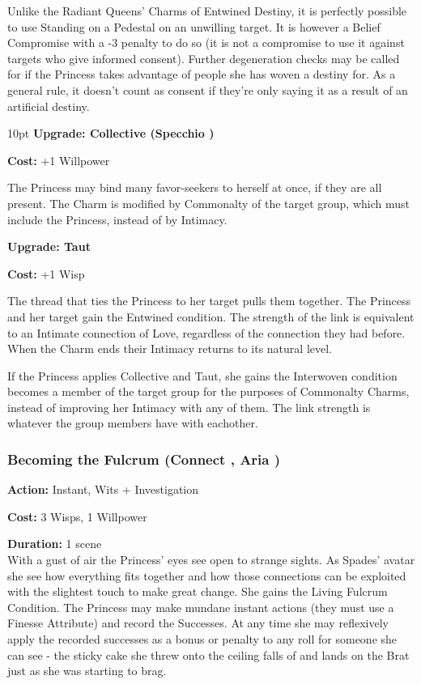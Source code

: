 Unlike the Radiant Queens' Charms of Entwined Destiny, it is perfectly possible to use Standing on a Pedestal on an unwilling target. It is however a Belief Compromise with a -3 penalty to do so (it is not a compromise to use it against targets who give informed consent). Further degeneration checks may be called for if the Princess takes advantage of people she has woven a destiny for. As a general rule, it doesn't count as consent if they're only saying it as a result of an artificial destiny.

\begin{myindentpar}{10pt} \textbf{Upgrade: Collective (Specchio \textbullet\textbullet\textbullet\textbullet)}

\noindent \textbf{Cost:} +1 Willpower

The Princess may bind many favor-seekers to herself at once, if they are all present. The Charm is modified by Commonalty of the target group, which must include the Princess, instead of by Intimacy.

\textbf{Upgrade: Taut}

\noindent \textbf{Cost:} +1 Wisp

The thread that ties the Princess to her target pulls them together. The Princess and her target gain the Entwined condition. The strength of the link is equivalent to an Intimate connection of Love, regardless of the connection they had before. When the Charm ends their Intimacy returns to its natural level.

If the Princess applies Collective and Taut, she gains the Interwoven condition becomes a member of the target group for the purposes of Commonalty Charms, instead of improving her Intimacy with any of them. The link strength is whatever the group members have with eachother.\end{myindentpar}


\subsubsection*{Becoming the Fulcrum (Connect \textbullet\textbullet\textbullet\textbullet\textbullet, Aria \textbullet\textbullet\textbullet\textbullet)}

\noindent \textbf{Action:} Instant, Wits + Investigation

\noindent \textbf{Cost:} 3 Wisps, 1 Willpower

\noindent \textbf{Duration:} 1 scene \\

\noindent With a gust of air the Princess' eyes see open to strange sights. As Spades' avatar she see how everything fits together and how those connections can be exploited with the slightest touch to make great change. She gains the Living Fulcrum Condition. The Princess may make mundane instant actions (they must use a Finesse Attribute) and record the Successes. At any time she may reflexively apply the recorded successes as a bonus or penalty to any roll for someone she can see - the sticky cake she threw onto the ceiling falls of and lands on the Brat just as she was starting to brag. 

